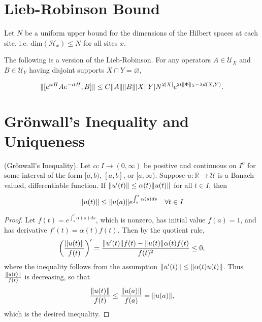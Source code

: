 \documentclass[12pt, letterpaper]{article}
\begin{document}
\section{Lieb-Robinson Bound}
\label{sec:L-R}

Let $N$ be a uniform upper bound for the dimensions of the Hilbert spaces at each site, i.e. $\text{dim}(\mathcal{H}_x) \leq N$ for all sites $x$.

The following is a version of the Lieb-Robinson. For any operators $A \in \mathcal{U}_X$ and $B \in \mathcal{U}_Y$ having disjoint supports $X\cap Y = \varnothing$, 

\[\lVert  [e^{itH}Ae^{-itH}, B]  \rVert \leq  C \lVert A \rVert\lVert B \rVert |X| |Y| N^{2|X|} e^{2t\lVert \Phi \rVert_\lambda - \lambda d(X, Y)}.\]

\section{Gr\"{o}nwall's Inequality and Uniqueness}

\begin{theorem}
(Gr\"{o}nwall's Inequality). Let $\alpha : I \to (0,\infty)$ be positive and continuous on $I^o$ for some interval of the form $[a,b)$, $[a,b]$, or $[a,\infty)$. Suppose $u : \mathbb{R} \to \mathcal{U}$ is a Banach-valued, differentiable function. If $\lVert u'(t) \rVert \leq \alpha(t)\lVert u(t) \rVert$ for all $t\in I$, then 
\[\lVert u(t) \rVert \leq \lVert u(a) \rVert e^{\int_a^t \alpha(s)ds} \quad \forall t\in I\]
\end{theorem}
\label{thm:gronwallinequality}
\begin{proof}
Let $f(t) = e^{\int_a^t \alpha(s)ds}$, which is nonzero, has initial value $f(a)=1$, and has derivative $f'(t) = \alpha(t) f(t)$. Then by the quotient rule,
\[\left(\frac{\lVert u(t) \rVert}{f(t)}\right)' = \frac{\lVert u'(t) \rVert f(t) - \lVert u(t) \rVert\alpha(t)f(t)}{f(t)^2} \leq 0,\]
where the inequality follows from the assumption $\lVert u'(t) \rVert \leq \lVert \alpha(t)u(t) \rVert$. Thus $\frac{\lVert u(t) \rVert}{f(t)}$ is decreasing, so that 
\[\frac{\lVert u(t) \rVert}{f(t)} \leq \frac{\lVert u(a) \rVert}{f(a)} = \lVert u(a) \rVert,\]
which is the desired inequality.
\end{proof}
\end{document}
